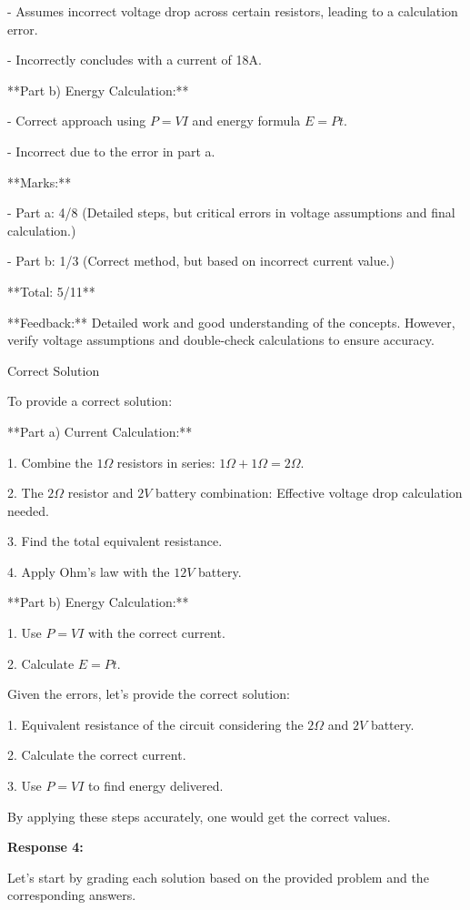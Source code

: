 \documentclass[a4paper,11pt]{article}
\begin{document}
- Assumes incorrect voltage drop across certain resistors, leading to a calculation error.

- Incorrectly concludes with a current of 18A.

**Part b) Energy Calculation:**

- Correct approach using \( P = VI \) and energy formula \( E = Pt \).

- Incorrect due to the error in part a.

**Marks:**

- Part a: 4/8 (Detailed steps, but critical errors in voltage assumptions and final calculation.)

- Part b: 1/3 (Correct method, but based on incorrect current value.)

**Total: 5/11**

**Feedback:** Detailed work and good understanding of the concepts. However, verify voltage assumptions and double-check calculations to ensure accuracy.

Correct Solution

To provide a correct solution:

**Part a) Current Calculation:**

1. Combine the \(1 \Omega\) resistors in series: \(1 \Omega + 1 \Omega = 2 \Omega\).

2. The \(2 \Omega\) resistor and \(2V\) battery combination: Effective voltage drop calculation needed.

3. Find the total equivalent resistance.

4. Apply Ohm's law with the \(12V\) battery.

**Part b) Energy Calculation:**

1. Use \( P = VI \) with the correct current.

2. Calculate \( E = Pt \).

Given the errors, let's provide the correct solution:

1. Equivalent resistance of the circuit 
considering the \(2 \Omega\) and \(2V\) battery.

2. Calculate the correct current.

3. Use \( P = VI \) to find energy delivered.

By applying these steps accurately, one would get the correct values.

\bigskip 
\textbf{Response 4:}

Let's start by grading each solution based on the provided problem and the corresponding answers.
\end{document}
